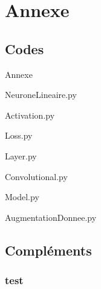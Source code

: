 \section{Annexe}

\subsection*{Codes}
\begin{frame}{Annexe}
    
\end{frame}


\begin{frame}{NeuroneLineaire.py}
    
\end{frame}


\begin{frame}{Activation.py}
    
\end{frame}


\begin{frame}{Loss.py}
    
\end{frame}


\begin{frame}{Layer.py}
    
\end{frame}


\begin{frame}{Convolutional.py}
    

\end{frame}


\begin{frame}{Model.py}
    
\end{frame}


\begin{frame}{AugmentationDonnee.py}
    
\end{frame}


\subsection*{Compléments}
\begin{frame}
    \frametitle{test}
    

\end{frame}

